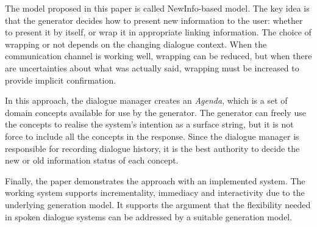 The model proposed in this paper is called NewInfo-based model. The key idea is that the generator decides how to present new information to the user: whether to present it by itself, or wrap it in appropriate linking information. The choice of wrapping or not depends on the changing dialogue context. When the communication channel is working well, wrapping can be reduced, but when there are uncertainties about what was actually said, wrapping must be increased to provide implicit confirmation.

In this approach, the dialogue manager creates an \emph{Agenda}, which is a set of domain concepts available for use by the generator. The generator can freely use the concepts to realise the system's intention as a surface string, but it is not force to include all the concepts in the response. Since the dialogue manager is responsible for recording dialogue history, it is the best authority to decide the new or old information status of each concept.

Finally, the paper demonstrates the approach with an implemented system. The working system supports incrementality, immediacy and interactivity due to the underlying generation model. It supports the argument that the flexibility needed in spoken dialogue systems can be addressed by a suitable generation model.
